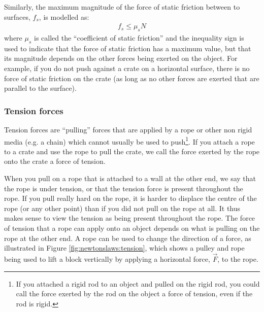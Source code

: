 Similarly, the maximum magnitude of the force of static friction between to surfaces, $f_s$, is modelled as:
\begin{align*}
f_s\leq\mu_sN
\end{align*}
where $\mu_s$ is called the ``coefficient of static friction'' and the inequality sign is used to indicate that the force of static friction has a maximum value, but that its magnitude depends on the other forces being exerted on the object. For example, if you do not push against a crate on a horizontal surface, there is no force of static friction on the crate (as long as no other forces are exerted that are parallel to the surface).



\subsubsection{Tension forces}
Tension forces are ``pulling'' forces that are applied by a rope or other non rigid media (e.g. a chain) which cannot usually be used to push\footnote{If you attached a rigid rod to an object and pulled on the rigid rod, you could call the force exerted by the rod on the object a force of tension, even if the rod is rigid.}. If you attach a rope to a crate and use the rope to pull the crate, we call the force exerted by the rope onto the crate a force of tension.

When you pull on a rope that is attached to a wall at the other end, we say that the rope is under tension, or that the tension force is present throughout the rope. If you pull really hard on the rope, it is harder to displace the centre of the rope (or any other point) than if you did not pull on the rope at all. It thus makes sense to view the tension as being present throughout the rope. The force of tension that a rope can apply onto an object depends on what is pulling on the rope at the other end. A rope can be used to change the direction of a force, as illustrated in Figure \ref{fig:newtonslaws:tension}, which shows a pulley and rope being used to lift a block vertically by applying a horizontal force, $\vec F$, to the rope.
 

